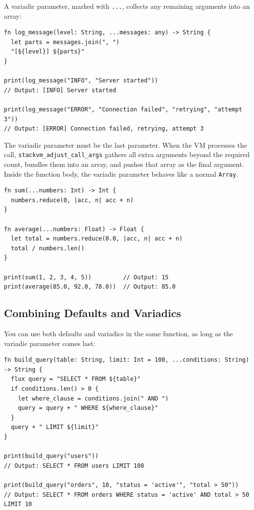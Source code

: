 A variadic parameter, marked with \lstinline|...|, collects any remaining arguments into an array:

\begin{lstlisting}[language=Lattice, caption={Variadic parameters}]
fn log_message(level: String, ...messages: any) -> String {
  let parts = messages.join(", ")
  "[${level}] ${parts}"
}

print(log_message("INFO", "Server started"))
// Output: [INFO] Server started

print(log_message("ERROR", "Connection failed", "retrying", "attempt 3"))
// Output: [ERROR] Connection failed, retrying, attempt 3
\end{lstlisting}

The variadic parameter must be the last parameter. When the VM processes the call, \texttt{stackvm\_adjust\_call\_args} gathers all extra arguments beyond the required count, bundles them into an array, and pushes that array as the final argument. Inside the function body, the variadic parameter behaves like a normal \lstinline|Array|.

\begin{lstlisting}[language=Lattice, caption={Variadic math functions}]
fn sum(...numbers: Int) -> Int {
  numbers.reduce(0, |acc, n| acc + n)
}

fn average(...numbers: Float) -> Float {
  let total = numbers.reduce(0.0, |acc, n| acc + n)
  total / numbers.len()
}

print(sum(1, 2, 3, 4, 5))         // Output: 15
print(average(85.0, 92.0, 78.0))  // Output: 85.0
\end{lstlisting}

\subsection{Combining Defaults and Variadics}\label{sec:defaults-and-variadics}

You can use both defaults and variadics in the same function, as long as the variadic parameter comes last:

\begin{lstlisting}[language=Lattice, caption={Defaults and variadics together}]
fn build_query(table: String, limit: Int = 100, ...conditions: String) -> String {
  flux query = "SELECT * FROM ${table}"
  if conditions.len() > 0 {
    let where_clause = conditions.join(" AND ")
    query = query + " WHERE ${where_clause}"
  }
  query + " LIMIT ${limit}"
}

print(build_query("users"))
// Output: SELECT * FROM users LIMIT 100

print(build_query("orders", 10, "status = 'active'", "total > 50"))
// Output: SELECT * FROM orders WHERE status = 'active' AND total > 50 LIMIT 10
\end{lstlisting}

